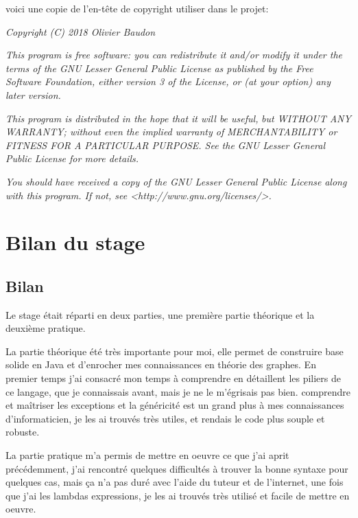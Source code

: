 \documentclass[12pt]{report}
\begin{document}
voici une copie de l'en-tête de copyright utiliser dans le projet:\newline

\begin{center}
\textit{Copyright (C) 2018 Olivier Baudon}

\textit{This program is free software: you can redistribute it and/or modify}
\textit{it under the terms of the GNU Lesser General Public License as published by}
\textit{the Free Software Foundation, either version 3 of the License, or}
\textit{(at your option) any later version.}

\textit{This program is distributed in the hope that it will be useful,}
\textit{but WITHOUT ANY WARRANTY; without even the implied warranty of}
\textit{MERCHANTABILITY or FITNESS FOR A PARTICULAR PURPOSE.  See the}
\textit{GNU Lesser General Public License for more details.}

\textit{You should have received a copy of the GNU Lesser General Public License}
\textit{along with this program.  If not, see <http://www.gnu.org/licenses/>.}
\end{center}

\chapter{Bilan du stage} 

\section{Bilan}

Le stage était réparti en deux parties, une première partie théorique et la deuxième pratique.\newline

La partie théorique été très importante pour moi, elle permet de construire base solide en Java et d'enrocher mes connaissances en théorie des graphes. En premier temps j'ai consacré mon temps à comprendre en détaillent les piliers de ce langage, que je connaissais avant, mais je ne le m'égrisais pas bien. comprendre et maîtriser les exceptions et la généricité est un grand plus à mes connaissances d'informaticien, je les ai trouvés très utiles, et rendais le code plus souple et robuste.\newline

La partie pratique m'a permis de mettre en oeuvre ce que j'ai aprit précédemment, j'ai rencontré quelques difficultés à trouver la bonne syntaxe pour quelques cas, mais ça n'a pas duré avec l'aide du tuteur et de l'internet, une fois que j'ai les lambdas expressions, je les ai trouvés très utilisé et facile de mettre en oeuvre. \newline
\end{document}

